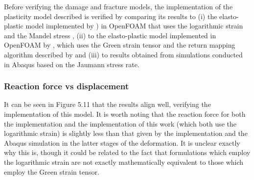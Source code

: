 \documentclass[sn-mathphys,Numbered,draft]{sn-jnl}%
\begin{document}

Before verifying the damage and fracture models, the implementation of the plasticity model described is verified by comparing its results to (i) the elasto-plastic model implemented by  \citet{clancy_improving_2019}) in OpenFOAM that uses the logarithmic strain and the Mandel stress \cite{caminero_modeling_2011}, (ii) to the elasto-plastic model implemented in OpenFOAM by \citet{cardiff_lagrangian_2017}, which uses the Green strain tensor and the return mapping algorithm described by \citet{simo_computational_1998} and (iii) to results obtained from simulations conducted in Abaqus based on the Jaumann stress rate.



%

\subsubsection{Reaction force vs displacement}

It can be seen in Figure 5.11 that the results align well, verifying the implementation of this model. It is worth noting that the reaction force for both the \citet{clancy_improving_2019} implementation and the implementation of this work (which both use the logarithmic strain) is slightly less than that given by the \citet{cardiff_lagrangian_2017} implementation and the Abaqus simulation in the latter stages of the deformation. It is unclear exactly why this is, though it could be related to the fact that formulations which employ the logarithmic strain are not exactly mathematically equivalent to those which employ the Green strain tensor.
\end{document}
